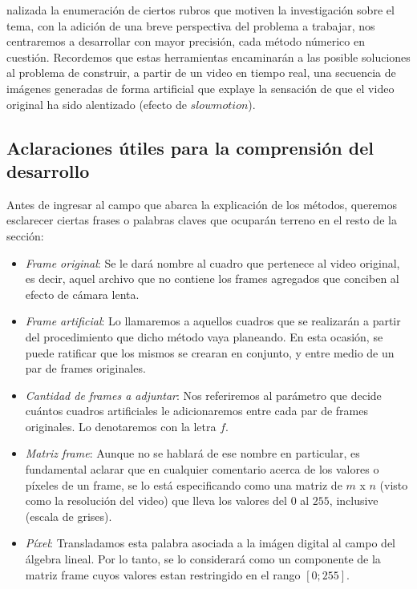 \par {}nalizada la enumeraci\'on de ciertos rubros que motiven la investigaci\'on sobre el tema, con la adici\'on de una breve perspectiva del problema a trabajar, nos centraremos a desarrollar con mayor precisi\'on, cada m\'etodo n\'umerico en cuesti\'on. Recordemos que estas herramientas encaminar\'an a las posible soluciones al problema de construir, a partir de un video en tiempo real, una secuencia de im\'agenes generadas de forma artificial que explaye la sensaci\'on de que el video original ha sido alentizado (efecto de $slowmotion$).

\subsection{Aclaraciones \'utiles para la comprensi\'on del desarrollo}

Antes de ingresar al campo que abarca la explicaci\'on de los m\'etodos, queremos esclarecer ciertas frases o palabras claves que ocupar\'an terreno en el resto de la secci\'on:

\begin{itemize}
	\item \textit{Frame original}: Se le dar\'a nombre al cuadro que pertenece al video original, es decir, aquel archivo que no contiene los frames agregados que conciben al efecto de c\'amara lenta.
	\item \textit{Frame artificial}: Lo llamaremos a aquellos cuadros que se realizar\'an a partir del procedimiento que dicho m\'etodo vaya planeando. En esta ocasi\'on, se puede ratificar que los mismos se crearan en conjunto, y entre medio de un par de frames originales.
	\item \textit{Cantidad de frames a adjuntar}: Nos referiremos al par\'ametro que decide cu\'antos cuadros artificiales le adicionaremos entre cada par de frames originales. Lo denotaremos con la letra $f$.
	\item \textit{Matriz frame}: Aunque no se hablar\'a de ese nombre en particular, es fundamental aclarar que en cualquier comentario acerca de los valores o p\'ixeles de un frame, se lo est\'a especificando como una matriz de $m$ x $n$ (visto como la resoluci\'on del video) que lleva los valores del $0$ al $255$, inclusive (escala de grises).
	\item \textit{P\'ixel}: Transladamos esta palabra asociada a la im\'agen digital al campo del \'algebra lineal. Por lo tanto, se lo considerar\'a como un componente de la matriz frame cuyos valores estan restringido en el rango $[0;255]$.
\end{itemize}

